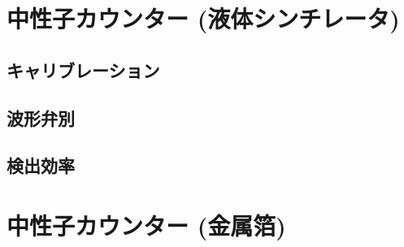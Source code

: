
\section{中性子カウンター (液体シンチレータ)}
\subsection{キャリブレーション}
\subsection{波形弁別}
\subsection{検出効率}

\section{中性子カウンター (金属箔)}


